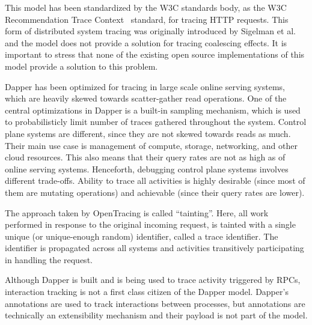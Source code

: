 This model has been standardized by the W3C standards body, as the W3C Recommendation Trace Context~\cite{w3c-trace-context2020Feb} standard, for tracing HTTP requests. This form of distributed system tracing was originally introduced by Sigelman et al.~\cite{dapper2010} and the model does not provide a solution for tracing coalescing effects. It is important to stress that none of the existing open source implementations of this model provide a solution to this problem.

Dapper has been optimized for tracing in large scale online serving systems, which are heavily skewed towards scatter-gather read operations. One of the central optimizations in Dapper is a built-in sampling mechanism, which is used to probabilisticly limit number of traces gathered throughout the system. Control plane systems are different, since they are not skewed towards reads as much. Their main use case is management of compute, storage, networking, and other cloud resources. This also means that their query rates are not as high as of online serving systems. Henceforth, debugging control plane systems involves different trade-offs. Ability to trace all activities is highly desirable (since most of them are mutating operations) and achievable (since their query rates are lower).

The approach taken by OpenTracing is called ``tainting''. Here, all work performed in response to the original incoming request, is tainted with a single unique (or unique-enough random) identifier, called a trace identifier. The identifier is propagated across all systems and activities transitively participating in handling the request.

Although Dapper is built and is being used to trace activity triggered by RPCs, interaction tracking is not a first class citizen of the Dapper model. Dapper's annotations are used to track interactions between processes, but annotations are technically an extensibility mechanism and their payload is not part of the model.

